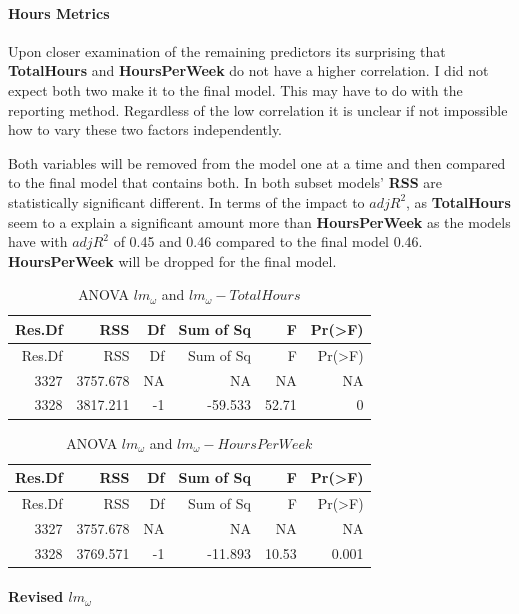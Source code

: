 \documentclass[]{article}
\let\oldparagraph\paragraph
\renewcommand{\paragraph}[1]{\oldparagraph{#1}\mbox{}}
\begin{document}
\hypertarget{hours-metrics}{%
\paragraph{Hours Metrics}\label{hours-metrics}}

Upon closer examination of the remaining predictors its surprising that
\textbf{TotalHours} and \textbf{HoursPerWeek} do not have a higher
correlation. I did not expect both two make it to the final model. This
may have to do with the reporting method. Regardless of the low
correlation it is unclear if not impossible how to vary these two
factors independently.

Both variables will be removed from the model one at a time and then
compared to the final model that contains both. In both subset models'
\textbf{RSS} are statistically significant different. In terms of the
impact to \(adjR^2\), as \textbf{TotalHours} seem to a explain a
significant amount more than \textbf{HoursPerWeek} as the models have
with \(adjR^2\) of 0.45 and 0.46 compared to the final model 0.46.
\textbf{HoursPerWeek} will be dropped for the final model.

\begin{longtable}[]{@{}rrrrrr@{}}
\caption{ANOVA \(lm_\omega\) and
\(lm_\omega-TotalHours\)}\tabularnewline
\toprule
Res.Df & RSS & Df & Sum of Sq & F & Pr(\textgreater{}F)\tabularnewline
\midrule
\endfirsthead
\toprule
Res.Df & RSS & Df & Sum of Sq & F & Pr(\textgreater{}F)\tabularnewline
\midrule
\endhead
3327 & 3757.678 & NA & NA & NA & NA\tabularnewline
3328 & 3817.211 & -1 & -59.533 & 52.71 & 0\tabularnewline
\bottomrule
\end{longtable}

\begin{longtable}[]{@{}rrrrrr@{}}
\caption{ANOVA \(lm_\omega\) and
\(lm_\omega-HoursPerWeek\)}\tabularnewline
\toprule
Res.Df & RSS & Df & Sum of Sq & F & Pr(\textgreater{}F)\tabularnewline
\midrule
\endfirsthead
\toprule
Res.Df & RSS & Df & Sum of Sq & F & Pr(\textgreater{}F)\tabularnewline
\midrule
\endhead
3327 & 3757.678 & NA & NA & NA & NA\tabularnewline
3328 & 3769.571 & -1 & -11.893 & 10.53 & 0.001\tabularnewline
\bottomrule
\end{longtable}

\hypertarget{revised-lm_omega}{%
\paragraph{\texorpdfstring{Revised
\(lm_\omega\)}{Revised lm\_\textbackslash{}omega}}\label{revised-lm_omega}}
\end{document}
